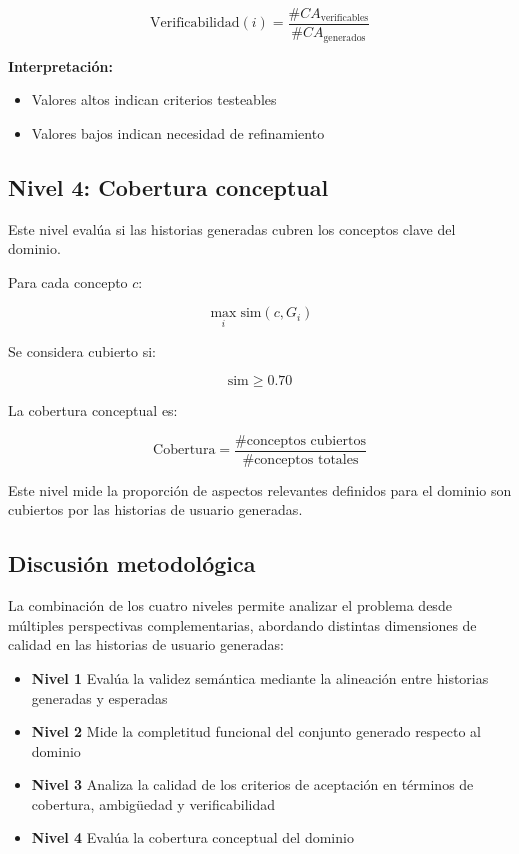 \[
\text{Verificabilidad}(i) = 
\frac{\#CA_{\text{verificables}}}{\#CA_{\text{generados}}}
\]

\textbf{Interpretación:}

\begin{itemize}
    \item Valores altos indican criterios testeables
    \item Valores bajos indican necesidad de refinamiento
\end{itemize}


\subsection{Nivel 4: Cobertura conceptual}
Este nivel evalúa si las historias generadas cubren los conceptos clave del dominio.

Para cada concepto $c$:

\[
\max_{i} \text{sim}(c, G_i)
\]

Se considera cubierto si:

\[
\text{sim} \geq 0.70
\]

La cobertura conceptual es:

\[
\text{Cobertura} = 
\frac{\#\text{conceptos cubiertos}}{\#\text{conceptos totales}}
\]

Este nivel mide la proporción de aspectos relevantes definidos para el dominio son cubiertos por las historias de usuario generadas.

\subsection{Discusión metodológica}

La combinación de los cuatro niveles permite analizar el problema desde múltiples perspectivas complementarias, abordando distintas dimensiones de calidad en las historias de usuario generadas:

\begin{itemize}
    \item \textbf{Nivel 1} Evalúa la validez semántica mediante la alineación entre historias generadas y esperadas
    \item \textbf{Nivel 2} Mide la completitud funcional del conjunto generado respecto al dominio
    \item \textbf{Nivel 3} Analiza la calidad de los criterios de aceptación en términos de cobertura, ambigüedad y verificabilidad
    \item \textbf{Nivel 4} Evalúa la cobertura conceptual del dominio
\end{itemize}

